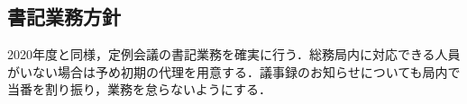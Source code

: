 \subsection*{書記業務方針}


2020年度と同様，定例会議の書記業務を確実に行う．総務局内に対応できる人員がいない場合は予め初期の代理を用意する．議事録のお知らせについても局内で当番を割り振り，業務を怠らないようにする．
